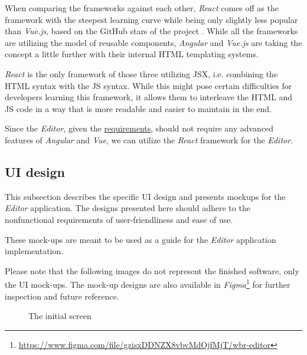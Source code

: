 When comparing the frameworks against each other, \textit{React} comes off as the framework with the steepest learning curve while being only slightly less popular than \textit{Vue.js}, based on the GitHub stars of the project .
While all the frameworks are utilizing the model of reusable components, \textit{Angular} and \textit{Vue.js} are taking the concept a little further with their internal \acs{HTML} templating systems.

\textit{React} is the only framework of those three utilizing \acs{JSX}, i.e. combining the \acs{HTML} syntax with the \acs{JS} syntax. 
While this might pose certain difficulties for developers learning this framework, it allows them to interleave the \acs{HTML} and \acs{JS} code in a way that is more readable and easier to maintain in the end.

Since the \textit{Editor}, given the \hyperref[requirements]{requirements}, should not require any advanced features of \textit{Angular} and \textit{Vue}, 
we can utilize the \textit{React} framework for the \textit{Editor}.

\subsection{UI design}

This subsection describes the specific \acs{UI} design and presents mockups for the \textit{Editor} application.
The designs presented here should adhere to the nonfunctional requirements of user-friendliness and ease of use.

These mock-ups are meant to be used as a guide for the \textit{Editor} application implementation.

Please note that the following images do not represent the finished software, only the UI mock-ups.
The mock-up designs are also available in \textit{Figma}\footnote{\href{https://www.figma.com/file/gzisxDDNZX8vbvMdOjfMjT/wbr-editor}{https://www.figma.com/file/gzisxDDNZX8vbvMdOjfMjT/wbr-editor}} for further inspection and future reference.

\clearpage
\begin{figure}[!h]
    \begin{center}
    \end{center}
    \caption{The initial screen}
\end{figure}


